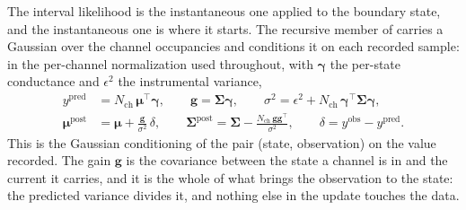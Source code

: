 The interval likelihood is the instantaneous one applied to the boundary state, and the
instantaneous one is where it starts. The recursive
member of \citet{moffatt2007estimation} carries a Gaussian over the channel occupancies and
conditions it on each recorded sample: in the per-channel normalization used throughout, with
$\boldsymbol{\gamma}$ the per-state conductance and $\epsilon^2$ the instrumental variance,
\begin{align}
  y^{\mathrm{pred}} &= N_{\mathrm{ch}}\,\boldsymbol{\mu}^\top\boldsymbol{\gamma},
  \qquad
  \mathbf{g} = \boldsymbol{\Sigma}\boldsymbol{\gamma},
  \qquad
  \sigma^2 = \epsilon^2 + N_{\mathrm{ch}}\,\boldsymbol{\gamma}^\top\boldsymbol{\Sigma}\boldsymbol{\gamma},
  \nonumber\\
  \boldsymbol{\mu}^{\mathrm{post}} &= \boldsymbol{\mu} + \frac{\mathbf{g}}{\sigma^2}\,\delta,
  \qquad
  \boldsymbol{\Sigma}^{\mathrm{post}} = \boldsymbol{\Sigma} - \frac{N_{\mathrm{ch}}\,\mathbf{g}\mathbf{g}^\top}{\sigma^2},
  \qquad
  \delta = y^{\mathrm{obs}} - y^{\mathrm{pred}}.
  \label{eq:macror}
\end{align}
This is the Gaussian conditioning of the pair (state, observation) on the value recorded. The
gain $\mathbf{g}$ is the covariance between the state a channel is in and the current it
carries, and it is the whole of what brings the observation to the state: the predicted
variance divides it, and nothing else in the update touches the data.
